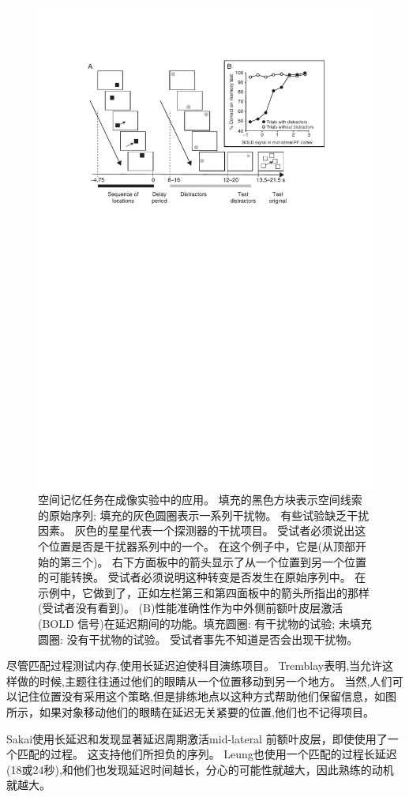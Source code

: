\begin{figure}
	\centering
	\includegraphics[width=0.7\linewidth]{chap6/6_10}
	\caption{空间记忆任务在成像实验中的应用。
		填充的黑色方块表示空间线索的原始序列; 填充的灰色圆圈表示一系列干扰物。
		有些试验缺乏干扰因素。
		灰色的星星代表一个探测器的干扰项目。
		受试者必须说出这个位置是否是干扰器系列中的一个。
		在这个例子中，它是(从顶部开始的第三个)。
		右下方面板中的箭头显示了从一个位置到另一个位置的可能转换。
		受试者必须说明这种转变是否发生在原始序列中。
		在示例中，它做到了，正如左栏第三和第四面板中的箭头所指出的那样(受试者没有看到)。
		(B)性能准确性作为中外侧前额叶皮层激活(BOLD 信号)在延迟期间的功能。填充圆圈: 有干扰物的试验; 未填充圆圈: 没有干扰物的试验。
		受试者事先不知道是否会出现干扰物\cite{sakai2002active}。}
	\label{fig:6_10}
\end{figure}


尽管匹配过程测试内存,使用长延迟迫使科目演练项目。
Tremblay\cite{tremblay2006rehearsal}表明,当允许这样做的时候,主题往往通过他们的眼睛从一个位置移动到另一个地方。
当然,人们可以记住位置没有采用这个策略,但是排练地点以这种方式帮助他们保留信息，如图所示，如果对象移动他们的眼睛在延迟无关紧要的位置,他们也不记得项目\cite{guerard2009processing}。


Sakai\cite{sakai2002active}使用长延迟和发现显著延迟周期激活mid-lateral 前额叶皮层，即使使用了一个匹配的过程。
这支持他们所担负的序列。
Leung\cite{leung2002sustained}也使用一个匹配的过程长延迟(18或24秒),和他们也发现延迟时间越长，分心的可能性就越大，因此熟练的动机就越大。


